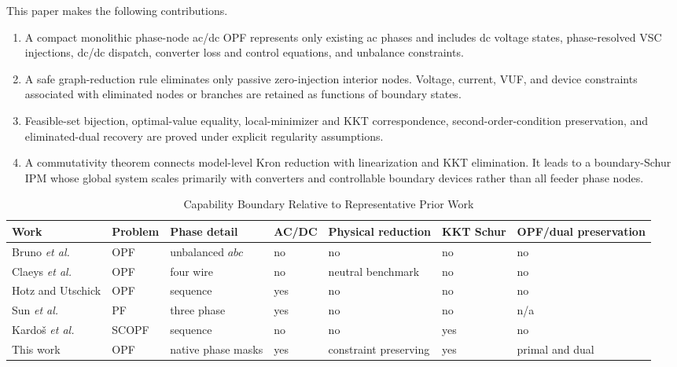 \documentclass[journal,10pt]{IEEEtran}
\begin{document}
This paper makes the following contributions.
\begin{enumerate}
  \item A compact monolithic phase-node ac/dc OPF represents only existing ac
  phases and includes dc voltage states, phase-resolved VSC injections, dc/dc
  dispatch, converter loss and control equations, and unbalance constraints.
  \item A safe graph-reduction rule eliminates only passive zero-injection
  interior nodes.  Voltage, current, VUF, and device constraints associated with
  eliminated nodes or branches are retained as functions of boundary states.
  \item Feasible-set bijection, optimal-value equality, local-minimizer and KKT
  correspondence, second-order-condition preservation, and eliminated-dual
  recovery are proved under explicit regularity assumptions.
  \item A commutativity theorem connects model-level Kron reduction with
  linearization and KKT elimination.  It leads to a boundary-Schur IPM whose
  global system scales primarily with converters and controllable boundary
  devices rather than all feeder phase nodes.
\end{enumerate}

\begin{table}[t]
\caption{Capability Boundary Relative to Representative Prior Work}
\label{tab:literature_position}
\centering
\footnotesize
\begin{tabular}{lllllll}
\toprule
Work & Problem & Phase detail & AC/DC & Physical reduction & KKT Schur & OPF/dual preservation\\
\midrule
Bruno \emph{et al.} \cite{bruno2011unbalanced} & OPF & unbalanced $abc$ & no & no & no & no\\
Claeys \emph{et al.} \cite{claeys2022fourwire} & OPF & four wire & no & neutral benchmark & no & no\\
Hotz and Utschick \cite{hotz2020hynet} & OPF & sequence & yes & no & no & no\\
Sun \emph{et al.} \cite{sun2024mdhem} & PF & three phase & yes & no & no & n/a\\
Kardo\v{s} \emph{et al.} \cite{kardos2020schur} & SCOPF & sequence & no & no & yes & no\\
This work & OPF & native phase masks & yes & constraint preserving & yes & primal and dual\\
\bottomrule
\end{tabular}
\end{table}
\end{document}
